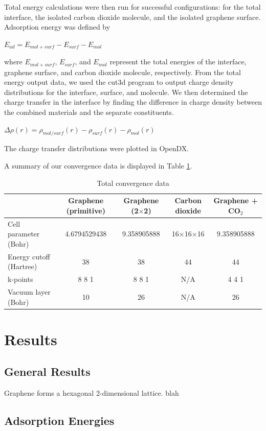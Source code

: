 \documentclass[letterpaper,showpacs,prb,preprint]{revtex4}
\begin{document}
Total energy calculations were then run for successful configurations: for the total interface, 
the isolated carbon dioxide molecule, 
and the isolated graphene surface. Adsorption energy was defined by

$E_{ad} = E_{mol+surf} - E_{surf} - E_{mol}$

where $E_{mol+surf}$, $E_{surf}$, and $E_{mol}$ represent the total energies of the interface, graphene surface, and carbon dioxide molecule, respectively. 
From the total energy output data, 
we used the cut3d program to output charge density distributions for the interface, surface, and molecule. 
We then determined the charge transfer in the interface by finding the difference in charge density between the combined materials and the separate constituents. 


$\Delta \rho(r) = \rho_{mol/surf}(r) - \rho_{surf}(r) - \rho_{mol}(r)$

The charge transfer distributions were plotted in OpenDX.

A summary of our convergence data is displayed in Table \ref{total}.


\begin{table}[hpt]
\caption{Total convergence data}
\begin{tabular}{l c  c  c  c}
 &Graphene (primitive)&Graphene (2$\times$2)&Carbon dioxide&Graphene + CO$_{2}$\\
\hline
\hline
Cell parameter (Bohr)&4.6794529438&9.358905888&16$\times$16$\times$16&9.358905888\\
Energy cutoff (Hartree)&38&38&44&44\\
k-points&8 8 1&8 8 1&N/A&4 4 1\\
Vacuum layer (Bohr)&10&26&N/A&26\\
\end{tabular}
\label{total}
\end{table}


\section{Results}

\subsection{General Results}

Graphene forms a hexagonal 2-dimensional lattice. blah
 

\subsection{Adsorption Energies}
\end{document}
